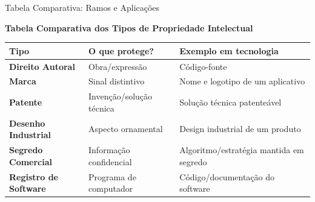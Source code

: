 \documentclass[9pt]{beamer}
\begin{document}
\begin{frame}{Tabela Comparativa: Ramos e Aplicações}
  \begin{center}
    \small
    \textbf{Tabela Comparativa dos Tipos de Propriedade Intelectual}
  \end{center}
  \vspace{0.2cm}
  \begin{center}
    \renewcommand{\arraystretch}{1.2}
    \footnotesize
    \begin{tabular}{lp{3.8cm}p{4.2cm}}
      \toprule
      \textbf{\color{structure.fg}Tipo} & \textbf{\color{structure.fg}O que protege?} & \textbf{\color{structure.fg}Exemplo em tecnologia} \\
      \midrule
      \textbf{Direito Autoral} & Obra/expressão & Código-fonte \\
      \textbf{Marca} & Sinal distintivo & Nome e logotipo de um aplicativo \\
      \textbf{Patente} & Invenção/solução técnica & Solução técnica patenteável \\
      \textbf{Desenho Industrial} & Aspecto ornamental & Design industrial de um produto \\
      \textbf{Segredo Comercial} & Informação confidencial & Algoritmo/estratégia mantida em segredo \\
      \textbf{Registro de Software} & Programa de computador & Código/documentação do software \\
      \bottomrule
    \end{tabular}
  \end{center}
\end{frame}
\end{document}
